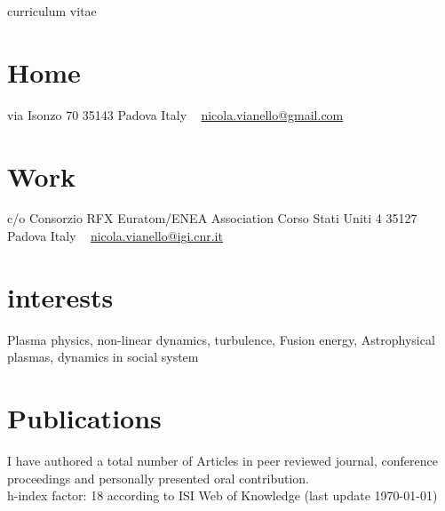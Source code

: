 \documentclass[]{nicola-cv}
\begin{document}
       {curriculum vitae}


\begin{aside}
  \section{Home}
    via Isonzo 70
    35143 Padova
    Italy
    ~
    \href{mailto:nicola.vianello@gmail.com}{nicola.vianello@gmail.com}
  \section{Work}
    c/o Consorzio RFX
    Euratom/ENEA Association
    Corso Stati Uniti 4
    35127 Padova
    Italy
    ~
    \href{mailto:nicola.vianello@igi.cnr.it}{nicola.vianello@igi.cnr.it}
\end{aside}

\section{interests}

Plasma physics, non-linear dynamics, turbulence, Fusion energy,
Astrophysical plasmas, dynamics in social system
















\section{Publications}
\nocite{*}
I have authored a total number of \printbibliography[env=counter,
 heading=counter, type=article] Articles in peer reviewed journal,  
 \printbibliography[env=counter, heading=counter, type=inproceedings]
 conference proceedings and personally presented
 \printbibliography[env=counter, heading=counter, type=misc] oral
 contribution. \\
h-index factor: 18 according to ISI Web of Knowledge (last update \today)

\printbibliography[type=article, title={article in peer-review journal}, heading=subbibliography, prefixnumbers={A}]
\printbibliography[type=inproceedings, title={National and
   international conference}, heading=subbibliography, prefixnumbers={B}]
\printbibliography[type=misc, title={First author oral contribution}, heading=subbibliography, prefixnumbers={C}]
\printbibliography[type=report, title={Report}, heading=subbibliography, prefixnumbers={D}]
\end{document}
